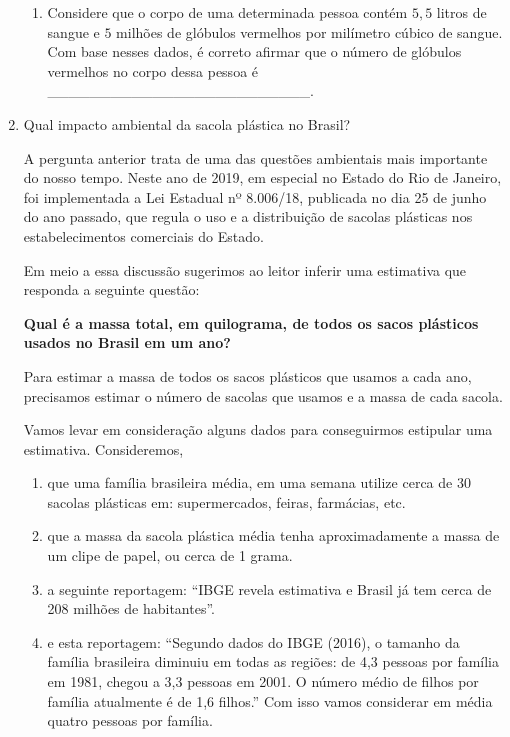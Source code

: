 \begin{enumerate}
\begin{enumerate}
\item {} 
Considere que o corpo de uma determinada pessoa contém \(5,5\) litros de sangue e \(5\) milhões de glóbulos vermelhos por milímetro cúbico de sangue. Com base nesses dados, é correto afirmar que o número de glóbulos vermelhos no corpo dessa pessoa é \_\_\_\_\_\_\_\_\_\_\_\_\_\_\_\_\_\_\_\_\_\_\_\_\_.

\end{enumerate}

\item Qual impacto ambiental da sacola plástica no Brasil?

A pergunta anterior trata de uma das questões ambientais mais importante do nosso tempo. Neste ano de 2019, em especial no Estado do Rio de Janeiro, foi implementada a Lei Estadual nº 8.006/18, publicada no dia 25 de junho do ano passado, que regula o uso e a distribuição de sacolas plásticas nos estabelecimentos comerciais do Estado.

Em meio a essa discussão sugerimos ao leitor inferir uma estimativa que responda a seguinte questão:

\textbf{Qual é a massa total, em quilograma, de todos os sacos plásticos usados no Brasil em um ano?}

Para estimar a massa de todos os sacos plásticos que usamos a cada ano, precisamos estimar o número de sacolas que usamos e a massa de cada sacola.

Vamos levar em consideração alguns dados para conseguirmos estipular uma estimativa. Consideremos,
\begin{enumerate}
\item {} 
que uma família brasileira média, em uma semana utilize cerca de 30 sacolas plásticas em: supermercados, feiras, farmácias, etc.

\item {} 
que a massa da sacola plástica média tenha aproximadamente a massa de um clipe de papel, ou cerca de 1 grama.

\item {} 
a seguinte reportagem: “IBGE revela estimativa e Brasil já tem cerca de 208 milhões de habitantes”.

\item {} 
e esta reportagem: “Segundo dados do IBGE (2016), o tamanho da família brasileira diminuiu em todas as regiões: de 4,3 pessoas por família em 1981, chegou a 3,3 pessoas em 2001. O número médio de filhos por família atualmente é de 1,6 filhos.” Com isso vamos considerar em média quatro pessoas por família.

\end{enumerate}

\end{enumerate}

\ifnum{}
\clearpage
\else
\notasfinais
\fi


% 

\nocite{*}